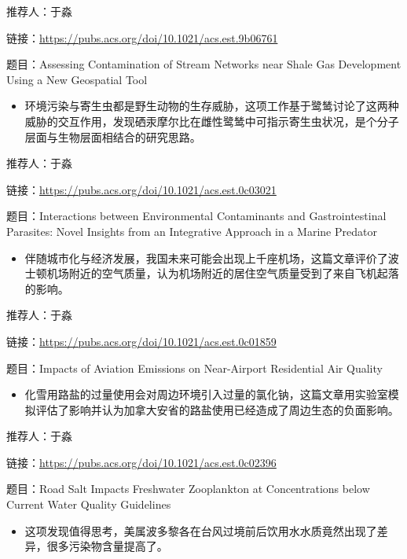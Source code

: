 \documentclass[]{book}
\providecommand{\tightlist}{%
  \setlength{\itemsep}{0pt}\setlength{\parskip}{0pt}}
\begin{document}
推荐人：于淼

链接：\url{https://pubs.acs.org/doi/10.1021/acs.est.9b06761}

题目：Assessing Contamination of Stream Networks near Shale Gas Development Using a New Geospatial Tool

\begin{itemize}
\tightlist
\item
  环境污染与寄生虫都是野生动物的生存威胁，这项工作基于鹭鸶讨论了这两种威胁的交互作用，发现硒汞摩尔比在雌性鹭鸶中可指示寄生虫状况，是个分子层面与生物层面相结合的研究思路。
\end{itemize}

推荐人：于淼

链接：\url{https://pubs.acs.org/doi/10.1021/acs.est.0c03021}

题目：Interactions between Environmental Contaminants and Gastrointestinal Parasites: Novel Insights from an Integrative Approach in a Marine Predator

\begin{itemize}
\tightlist
\item
  伴随城市化与经济发展，我国未来可能会出现上千座机场，这篇文章评价了波士顿机场附近的空气质量，认为机场附近的居住空气质量受到了来自飞机起落的影响。
\end{itemize}

推荐人：于淼

链接：\url{https://pubs.acs.org/doi/10.1021/acs.est.0c01859}

题目：Impacts of Aviation Emissions on Near-Airport Residential Air Quality

\begin{itemize}
\tightlist
\item
  化雪用路盐的过量使用会对周边环境引入过量的氯化钠，这篇文章用实验室模拟评估了影响并认为加拿大安省的路盐使用已经造成了周边生态的负面影响。
\end{itemize}

推荐人：于淼

链接：\url{https://pubs.acs.org/doi/10.1021/acs.est.0c02396}

题目：Road Salt Impacts Freshwater Zooplankton at Concentrations below Current Water Quality Guidelines

\begin{itemize}
\tightlist
\item
  这项发现值得思考，美属波多黎各在台风过境前后饮用水水质竟然出现了差异，很多污染物含量提高了。
\end{itemize}
\end{document}
